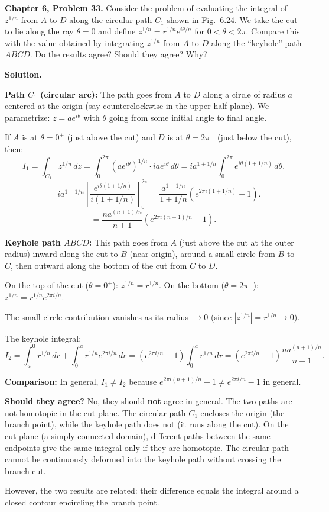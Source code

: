 \documentclass[12pt]{article}
\begin{document}
\textbf{Chapter 6, Problem 33.} Consider the problem of evaluating the integral of $z^{1/n}$ from $A$ to $D$ along the circular path $C_1$ shown in Fig.\ 6.24. We take the cut to lie along the ray $\theta = 0$ and define $z^{1/n} = r^{1/n}e^{i\theta/n}$ for $0 < \theta < 2\pi$. Compare this with the value obtained by integrating $z^{1/n}$ from $A$ to $D$ along the ``keyhole'' path $ABCD$. Do the results agree? Should they agree? Why?

\bigskip
\textbf{Solution.}

\textbf{Path $C_1$ (circular arc):} The path goes from $A$ to $D$ along a circle of radius $a$ centered at the origin (say counterclockwise in the upper half-plane). We parametrize: $z = ae^{i\theta}$ with $\theta$ going from some initial angle to final angle.

If $A$ is at $\theta = 0^+$ (just above the cut) and $D$ is at $\theta = 2\pi^-$ (just below the cut), then:
\[
I_1 = \int_{C_1} z^{1/n}\,dz = \int_0^{2\pi} (ae^{i\theta})^{1/n}\cdot iae^{i\theta}\,d\theta = ia^{1+1/n}\int_0^{2\pi}e^{i\theta(1+1/n)}\,d\theta.
\]
\[
= ia^{1+1/n}\left[\frac{e^{i\theta(1+1/n)}}{i(1+1/n)}\right]_0^{2\pi} = \frac{a^{1+1/n}}{1+1/n}\left(e^{2\pi i(1+1/n)}-1\right).
\]
\[
= \frac{na^{(n+1)/n}}{n+1}\left(e^{2\pi i(n+1)/n}-1\right).
\]

\textbf{Keyhole path $ABCD$:} This path goes from $A$ (just above the cut at the outer radius) inward along the cut to $B$ (near origin), around a small circle from $B$ to $C$, then outward along the bottom of the cut from $C$ to $D$.

On the top of the cut ($\theta = 0^+$): $z^{1/n} = r^{1/n}$.
On the bottom ($\theta = 2\pi^-$): $z^{1/n} = r^{1/n}e^{2\pi i/n}$.

The small circle contribution vanishes as its radius $\to 0$ (since $|z^{1/n}| = r^{1/n} \to 0$).

The keyhole integral:
\[
I_2 = \int_a^0 r^{1/n}\,dr + \int_0^a r^{1/n}e^{2\pi i/n}\,dr = (e^{2\pi i/n}-1)\int_0^a r^{1/n}\,dr = (e^{2\pi i/n}-1)\frac{na^{(n+1)/n}}{n+1}.
\]

\textbf{Comparison:} In general, $I_1 \neq I_2$ because $e^{2\pi i(n+1)/n}-1 \neq e^{2\pi i/n}-1$ in general.

\textbf{Should they agree?} No, they should \textbf{not} agree in general. The two paths are not homotopic in the cut plane. The circular path $C_1$ encloses the origin (the branch point), while the keyhole path does not (it runs along the cut). On the cut plane (a simply-connected domain), different paths between the same endpoints give the same integral only if they are homotopic. The circular path cannot be continuously deformed into the keyhole path without crossing the branch cut.

However, the two results are related: their difference equals the integral around a closed contour encircling the branch point.
\end{document}
